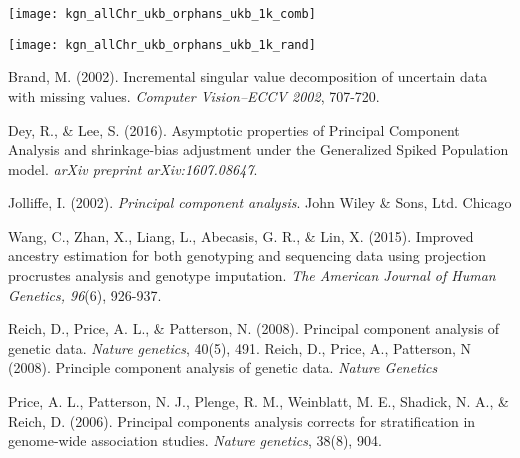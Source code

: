 \documentclass{article}
\begin{document}
\texttt{[image: kgn\_allChr\_ukb\_orphans\_ukb\_1k\_comb]}

\newpage
 
\texttt{[image: kgn\_allChr\_ukb\_orphans\_ukb\_1k\_rand]}

\newpage

\begin{thebibliography}{}
 
 Brand, M. (2002). Incremental singular value decomposition of uncertain data with missing values. {\it Computer Vision--ECCV 2002}, 707-720.

 Dey, R., \& Lee, S. (2016). Asymptotic properties of Principal Component Analysis and shrinkage-bias adjustment under the Generalized Spiked Population model. {\it arXiv preprint arXiv:1607.08647}.
  
 Jolliffe, I. (2002). {\it Principal component analysis}. John Wiley \& Sons, Ltd.
Chicago	


  Wang, C., Zhan, X., Liang, L., Abecasis, G. R., \& Lin, X. (2015). Improved ancestry estimation for both genotyping and sequencing data using projection procrustes analysis and genotype imputation. {\it The American Journal of Human Genetics, 96}(6), 926-937.

  Reich, D., Price, A. L., \& Patterson, N.
   (2008). Principal component analysis of genetic data. {\it Nature genetics}, 40(5), 491.
   Reich, D., Price, A., Patterson, N (2008).
   Principle component analysis of genetic data. {\it Nature Genetics}

    Price, A. L., Patterson, N. J., Plenge,
     R. M., Weinblatt, M. E., Shadick, N. A., \& Reich, D. (2006). Principal
     components analysis corrects for stratification in genome-wide association
     studies. {\it Nature genetics}, 38(8), 904.

\end{thebibliography}
\end{document}
